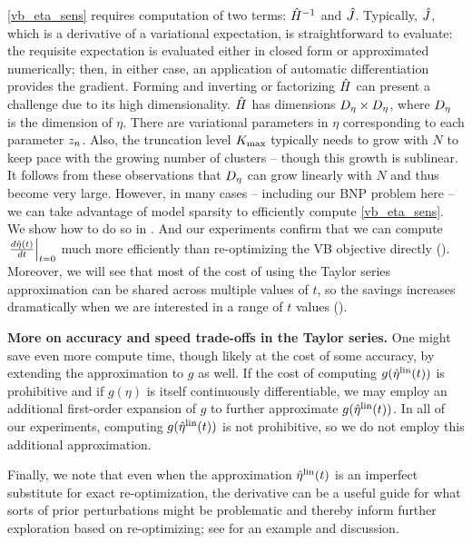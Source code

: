 \eqref{vb_eta_sens} requires computation of two terms: $\hat{H}^{-1}$ and
$\hat J$.  Typically, $\hat J$, which is a derivative of a
variational expectation, is straightforward to evaluate: the requisite
expectation is evaluated either in closed form or approximated numerically;
then, in either case, an application of automatic differentiation provides the
gradient. Forming and inverting or factorizing $\hat{H}$ can present a
challenge due to its high dimensionality. $\hat{H}$ has dimensions ${D_{\eta}}
\times {D_{\eta}}$, where ${D_{\eta}}$ is the dimension of $\eta$. There are
variational parameters in $\eta$ corresponding to each parameter $z_n$. Also,
the truncation level ${K_{\mathrm{max}}}$ typically needs to grow with $N$ to keep pace with
the growing number of clusters -- though this growth is sublinear. It follows
from these observations that ${D_{\eta}}$ can grow linearly with $N$ and thus
become very large.  However, in many cases -- including our BNP problem here --
we can take advantage of model sparsity to efficiently compute
\eqref{vb_eta_sens}. We show how to do so in . And
our experiments confirm that we can compute $\left.\frac{d \hat\eta(t)}{d t}\right\vert_{t=0}$
much more efficiently than re-optimizing the VB objective directly
(). Moreover, we will see that most of the cost of using
the Taylor series approximation can be shared across multiple values of $t$, so
the savings increases dramatically when we are interested in a range of $t$
values ().

\noindent \textbf{More on accuracy and speed trade-offs in the Taylor series.}
One might save even more compute time, though likely at the cost of some
accuracy, by extending the approximation to $g$ as well. If the cost of
computing $g(\hat\eta^{\mathrm{lin}}(t))$ is prohibitive and if $g(\eta)$ is itself continuously
differentiable, we may employ an additional first-order expansion of $g$ to
further approximate $g(\hat\eta^{\mathrm{lin}}(t))$. In all of our experiments, computing
$g(\hat\eta^{\mathrm{lin}}(t))$ is not prohibitive, so we do not employ this additional
approximation.

Finally, we note that even when the approximation $\hat\eta^{\mathrm{lin}}(t)$ is an imperfect
substitute for exact re-optimization, the derivative can be a useful guide for
what sorts of prior perturbations might be problematic and thereby inform
further exploration based on re-optimizing; see  for
an example and discussion.
